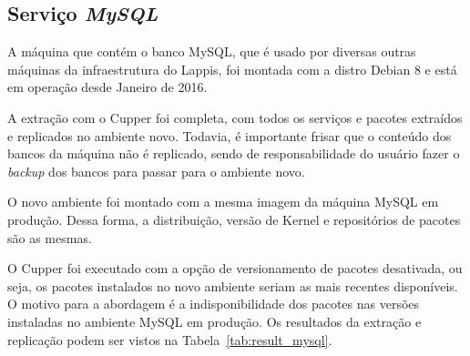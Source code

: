 \subsection{Serviço \textit{MySQL}}

A máquina que contém o banco MySQL, que é usado por diversas outras máquinas da
infraestrutura do Lappis, foi montada com a distro Debian 8 e está em operação 
desde Janeiro de 2016.

A extração com o Cupper foi completa, com todos os serviços e pacotes extraídos
e replicados no ambiente novo. Todavia, é importante frisar que o conteúdo dos bancos
da máquina não é replicado, sendo de responsabilidade do usuário fazer o \textit{backup}
dos bancos para passar para o ambiente novo.

O novo ambiente foi montado com a mesma imagem da máquina MySQL em produção.
Dessa forma, a distribuição, versão de Kernel e repositórios de pacotes são as
mesmas.

O Cupper foi executado com a opção de versionamento de pacotes desativada, ou seja,
os pacotes instalados no novo ambiente seriam as mais recentes disponíveis. 
O motivo para a abordagem é a indisponibilidade dos pacotes nas versões 
instaladas no ambiente MySQL em produção. Os resultados da extração e replicação
podem ser vistos na Tabela~\ref{tab:result_mysql}.


